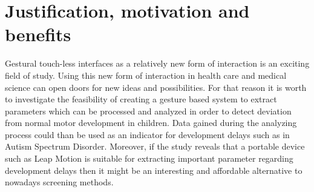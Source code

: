 


\section{Justification, motivation and benefits}
Gestural touch-less interfaces as a relatively new form of interaction is an exciting field of study. Using this new form of interaction in health care and medical science can open doors for new ideas and possibilities. For that reason it is worth to investigate the feasibility of creating a gesture based system to extract parameters which can be processed and analyzed in order to detect deviation from normal motor development in children. Data gained during the analyzing process could than be used as an indicator for development delays such as in Autism Spectrum Disorder.
Moreover, if the study reveals that a portable device such as Leap Motion is suitable for extracting important parameter regarding development delays then it might be an interesting and affordable alternative to nowadays screening methods.



